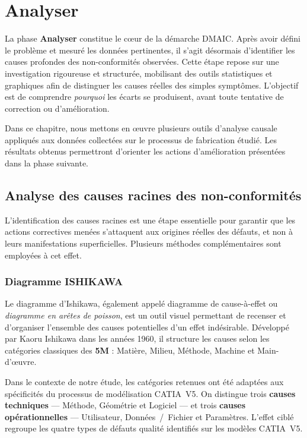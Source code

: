 \chapter{Analyser}
\label{cp:analyser}

La phase \textbf{Analyser} constitue le cœur de la démarche DMAIC. Après avoir défini le problème et mesuré les données pertinentes, il s'agit désormais d'identifier les causes profondes des non-conformités observées. Cette étape repose sur une investigation rigoureuse et structurée, mobilisant des outils statistiques et graphiques afin de distinguer les causes réelles des simples symptômes. L'objectif est de comprendre \textit{pourquoi} les écarts se produisent, avant toute tentative de correction ou d'amélioration.

Dans ce chapitre, nous mettons en œuvre plusieurs outils d'analyse causale appliqués aux données collectées sur le processus de fabrication étudié. Les résultats obtenus permettront d'orienter les actions d'amélioration présentées dans la phase suivante.

\section{Analyse des causes racines des non-conformités}
\label{sec:analyse-causes-racines}

L'identification des causes racines est une étape essentielle pour garantir que les actions correctives menées s'attaquent aux origines réelles des défauts, et non à leurs manifestations superficielles. Plusieurs méthodes complémentaires sont employées à cet effet.

\subsection{Diagramme ISHIKAWA}
\label{subsec:ishikawa}

Le diagramme d'Ishikawa, également appelé diagramme de cause-à-effet ou \textit{diagramme en arêtes de poisson}, est un outil visuel permettant de recenser et d'organiser l'ensemble des causes potentielles d'un effet indésirable. Développé par Kaoru Ishikawa dans les années 1960, il structure les causes selon les catégories classiques des \textbf{5M} : Matière, Milieu, Méthode, Machine et Main-d'œuvre.

Dans le contexte de notre étude, les catégories retenues ont été adaptées aux spécificités du processus de modélisation CATIA~V5. On distingue trois \textbf{causes techniques} --- Méthode, Géométrie et Logiciel --- et trois \textbf{causes opérationnelles} --- Utilisateur, Données~/~Fichier et Paramètres. L'effet ciblé regroupe les quatre types de défauts qualité identifiés sur les modèles CATIA~V5.

